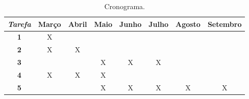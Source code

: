 \begin{table}
\begin{center}
\begin{small}
\begin{tabular}{|c|c|c|c|c|c|c|c|} 
\hline
\emph{Tarefa} &
Março & 
Abril & 
Maio &  
Junho & 
Julho &
Agosto & 
Setembro \\ \hline
\textbf{1} & X &  &  &  &  &  &  \\ \hline 
\textbf{2} & X & X &  &  &  &  &  \\ \hline 
\textbf{3} &  &  & X & X & X &  &  \\ \hline 
\textbf{4} & X & X & X &  &  &  &  \\ \hline 
\textbf{5} &  &  & X & X & X & X & X \\ \hline 
\end{tabular}
\caption{Cronograma.}
\label{tab:tab:F5}
\end{small}
\end{center}
\end{table}
